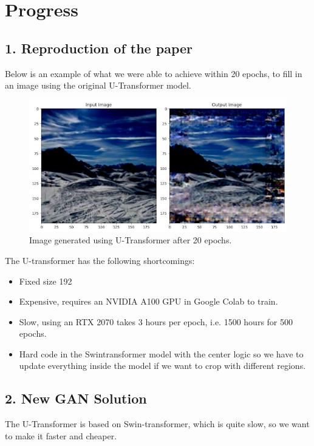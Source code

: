 \documentclass[sigconf]{acmart}
\begin{document}
\section*{Progress}

\subsection*{1. Reproduction of the paper}
Below is an example of what we were able to achieve within 20 epochs, to fill in an image using the original U-Transformer model. 

\begin{figure}[h]
    \centering
    \includegraphics[width=0.8\linewidth]{utransformer.png}
    \caption{Image generated using U-Transformer after 20 epochs.}
\end{figure}

The U-transformer has the following shortcomings:
\begin{itemize}
    \item Fixed size 192
    \item Expensive, requires an NVIDIA A100 GPU in Google Colab to train.
    \item Slow, using an RTX 2070 takes 3 hours per epoch, i.e. 1500 hours for 500 epochs.
    \item Hard code in the Swintransformer model with the center logic so we have to update everything inside the model if we want to crop with different regions.
\end{itemize}

\subsection*{2. New GAN Solution}
The U-Transformer is based on Swin-transformer, which is quite slow, so we want to make it faster and cheaper.
\end{document}
